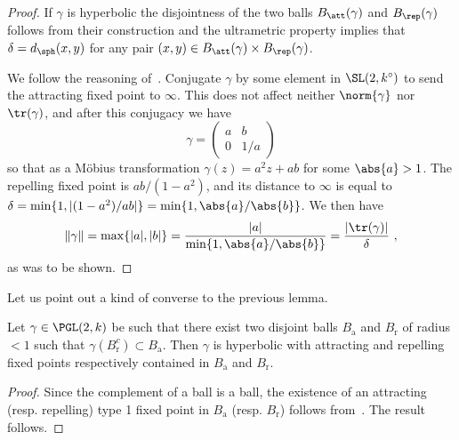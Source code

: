 \begin{proof}
If $\gamma$ is hyperbolic the disjointness of the two balls $B_\att(\gamma)$ and $B_\rep(\gamma)$ follows from their construction and the ultrametric property implies that $\delta = d_{\sph} (x,y)$ for any pair $(x,y)\in B_\att(\gamma) \times B_\rep(\gamma)$.

We follow the reasoning of~\cite[Lem.~2.1]{kleinbif}. Conjugate $\gamma$ by some element in $\SL(2,k^\circ)$ to send the attracting fixed point to $\infty$. This does not affect neither $\norm{\gamma}$ nor $\tr(\gamma)$, and after this
conjugacy we have
\[
\gamma =
\begin{pmatrix} a & b \\ 0 & 1/a
\end{pmatrix}
\]
so that as a M\"obius transformation
$\gamma(z) = a^2z+ ab$ for some $\abs{a}>1$. The repelling fixed point is $ab/(1-a^2)$, and its distance to $\infty$ is equal to $\delta = \min \{ 1, |(1-a^2)/ab|\} = \min \{ 1, {\abs{a}}/{\abs{b}}\}$. We then have
\[
\| \gamma \| = \max\{ |a|, |b|\} = \frac{|a|}{\min \{ 1, {\abs{a}}/{\abs{b}}\}} = \frac{|\tr(\gamma)|}{\delta}~,
\]
as was to be shown.
\end{proof}

Let us point out a kind of converse to the previous lemma.

\begin{lemm}\label{lem:distinct balls}
Let $\gamma \in \PGL(2,k)$ be such that there exist two disjoint balls $B_\mathrm{a}$ and $B_\mathrm{r}$ of radius $<1$ such that $\gamma(B_\mathrm{r}^c)\subset B_\mathrm{a}$. Then $\gamma$ is hyperbolic with attracting and repelling fixed points respectively contained in $B_\mathrm{a}$ and $B_\mathrm{r}$.
\end{lemm}

\begin{proof}
Since the complement of a ball is a ball, the existence of an attracting (resp. repelling) type 1 fixed point in $B_\mathrm{a}$ (resp. $B_\mathrm{r}$) follows from~\cite[Thm.~10.69]{baker-rumely}. The result follows.
\end{proof}



